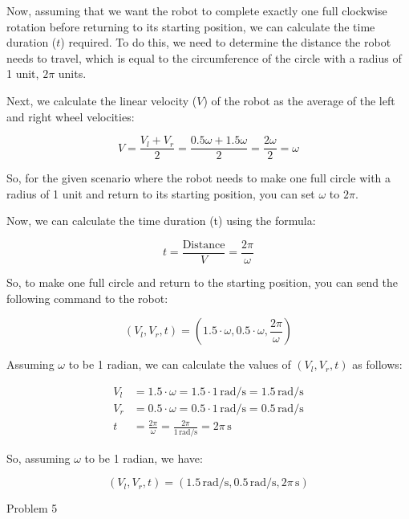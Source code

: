 \documentclass[answers]{exam}
\begin{document}
\begin{questions}
\begin{parts}
\begin{solution}
            Now, assuming that we want the robot to complete exactly one full clockwise
            rotation before returning to its starting position, we can calculate the time
            duration (\(t\)) required. To do this, we need to determine the distance the
            robot needs to travel, which is equal to the circumference of the circle with a
            radius of 1 unit, \(2\pi\) units.

            Next, we calculate the linear velocity (\(V\)) of the robot as the average of
            the left and right wheel velocities:

            \[V = \frac{V_l + V_r}{2} = \frac{0.5\omega + 1.5\omega}{2} = \frac{2\omega}{2} = \omega\]

            So, for the given scenario where the robot needs to make one full circle with a
            radius of 1 unit and return to its starting position, you can set \(\omega\) to
            \(2\pi\).

            Now, we can calculate the time duration (t) using the formula:

            \[t = \frac{\text{Distance}}{V} = \frac{2\pi}{\omega}\]

            So, to make one full circle and return to the starting position, you can send
            the following command to the robot:

            \[(V_l, V_r, t) = (1.5\cdot\omega, 0.5\cdot\omega, \frac{2\pi}{\omega})\]

            Assuming \(\omega\) to be 1 radian, we can calculate the values of \((V_l, V_r,
            t)\) as follows:

            \begin{align*}
                V_l & = 1.5 \cdot \omega = 1.5 \cdot 1 \, \text{rad/s} = 1.5 \, \text{rad/s}    \\
                V_r & = 0.5 \cdot \omega = 0.5 \cdot 1 \, \text{rad/s} = 0.5 \, \text{rad/s}    \\
                t   & = \frac{2\pi}{\omega} = \frac{2\pi}{1 \, \text{rad/s}} = 2\pi \, \text{s}
            \end{align*}

            So, assuming \(\omega\) to be 1 radian, we have:

            \[
                (V_l, V_r, t) = (1.5 \, \text{rad/s}, 0.5 \, \text{rad/s}, 2\pi \, \text{s})
            \]
        \end{solution}
    \end{parts}
    \question Problem 5

\end{questions}
\end{document}
